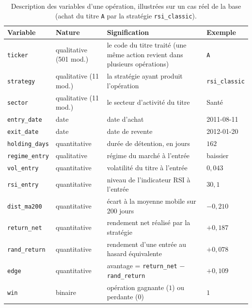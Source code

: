 \begin{table}[H]
\centering
\caption{Description des variables d'une opération, illustrées sur un cas réel
de la base (achat du titre \texttt{A} par la stratégie \texttt{rsi\_classic}).}
\label{tab:dico-trades}
\renewcommand{\arraystretch}{1.3}
\small
\begin{tabular}{@{}>{\raggedright\arraybackslash}p{2.4cm}>{\raggedright\arraybackslash}p{2.6cm}>{\raggedright\arraybackslash}p{5.6cm}l@{}}
\toprule
Variable & Nature & Signification & Exemple \\
\midrule
\texttt{ticker}       & qualitative (501 mod.) & le code du titre traité (une même action revient dans plusieurs opérations) & \texttt{A} \\
\texttt{strategy}     & qualitative (11 mod.)  & la stratégie ayant produit l'opération & \texttt{rsi\_classic} \\
\texttt{sector}       & qualitative (11 mod.)  & le secteur d'activité du titre & Santé \\
\texttt{entry\_date}  & date                   & date d'achat & 2011-08-11 \\
\texttt{exit\_date}   & date                   & date de revente & 2012-01-20 \\
\texttt{holding\_days}& quantitative           & durée de détention, en jours & $162$ \\
\texttt{regime\_entry}& qualitative            & régime du marché à l'entrée & baissier \\
\texttt{vol\_entry}   & quantitative           & volatilité du titre à l'entrée & $0{,}043$ \\
\texttt{rsi\_entry}   & quantitative           & niveau de l'indicateur RSI à l'entrée & $30{,}1$ \\
\texttt{dist\_ma200}  & quantitative           & écart à la moyenne mobile sur 200 jours & $-0{,}210$ \\
\texttt{return\_net}  & quantitative           & rendement net réalisé par la stratégie & $+0{,}187$ \\
\texttt{rand\_return} & quantitative           & rendement d'une entrée au hasard équivalente & $+0{,}078$ \\
\texttt{edge}         & quantitative           & avantage = \texttt{return\_net} $-$ \texttt{rand\_return} & $+0{,}109$ \\
\texttt{win}          & binaire                & opération gagnante ($1$) ou perdante ($0$) & $1$ \\
\bottomrule
\end{tabular}
\end{table}

